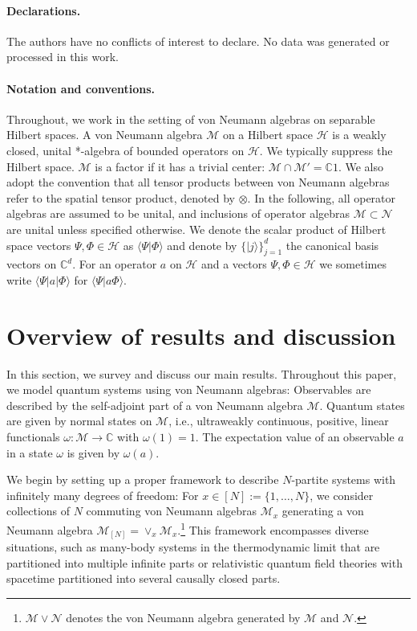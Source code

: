 \documentclass[a4paper, 10pt, onecolumn, accepted=2025-07-22]{quantumarticle}
\theoremstyle{definition}
\newcommand{\braket}[2]{\langle #1|#2\rangle}
\newcommand{\ket}[1]{|#1\rangle}
\newcommand{\bra}[1]{\langle#1|}
\newcommand{\mc}{\mathcal}
\def\CC{{\mathbb C}}
\def\H{{\mc H}}
\def\M{{\mc M}}
\def\N{{\mc N}}
\newcommand*{\1}{\text{\usefont{U}{bbold}{m}{n}1}}
\begin{document}
\paragraph{Declarations.}
The authors have no conflicts of interest to declare.
No data was generated or processed in this work.


\paragraph{Notation and conventions.}
Throughout, we work in the setting of von Neumann algebras on separable Hilbert spaces. A von Neumann algebra $\M$ on a Hilbert space $\H$ is a weakly closed, unital *-algebra of bounded operators on $\H$. We typically suppress the Hilbert space. $\M$ is a factor if it has a trivial center: $\M \cap \M' = \CC 1$. 
We also adopt the convention that all tensor products between von Neumann algebras refer to the spatial tensor product, denoted by $\otimes$.
In the following, all operator algebras are assumed to be unital, and inclusions of operator algebras $\M\subset\N$ are unital unless specified otherwise.
We denote the scalar product of Hilbert space vectors $\Psi,\Phi\in\H$ as $\langle\Psi|\Phi\rangle$ and denote by $\{\ket{j}\}_{j=1}^{d}$ the canonical basis vectors on $\CC^d$.
For an operator $a$ on $\H$ and a vectors $\Psi,\Phi\in\H$ we sometimes write $\bra\Psi a\ket\Phi$ for $\braket{\Psi}{a\Phi}$.


\section{Overview of results and discussion}

In this section, we survey and discuss our main results. 
Throughout this paper, we model quantum systems using von Neumann algebras: Observables are described by the self-adjoint part of a von Neumann algebra $\M$. Quantum states are given by normal states on $\M$, i.e., ultraweakly continuous, positive, linear functionals $\omega:\M\to\CC$ with $\omega(1)=1$.
The expectation value of an observable $a$ in a state $\omega$ is given by $\omega(a)$.

We begin by setting up a proper framework to describe $N$-partite systems with infinitely many degrees of freedom: For $x\in[N]:=\{1,\ldots,N\}$, we consider collections of $N$ commuting von Neumann algebras $\M_x$ generating a von Neumann algebra $\M_{[N]} = \vee_x \M_x$.\footnote{$\M\vee\N$ denotes the von Neumann algebra generated by $\M$ and $\N$.}
This framework encompasses diverse situations, such as many-body systems in the thermodynamic limit that are partitioned into multiple infinite parts or relativistic quantum field theories with spacetime partitioned into several causally closed parts. 
\end{document}
